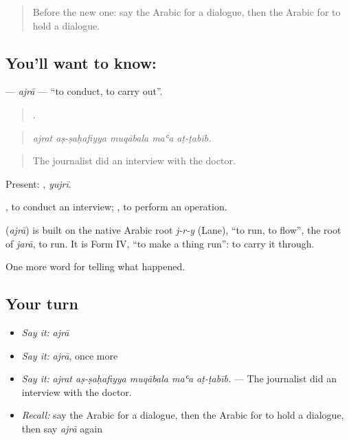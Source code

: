 \label{lesson:AR-C302-ajra}



\begin{quote}
Before the new one: say the Arabic for a dialogue, then the Arabic for to hold a dialogue.
\end{quote}

\subsection*{You'll want to know: }
\textbf{} — \emph{ajrā} — \textquotedblleft{}to conduct, to carry out\textquotedblright{}.

\begin{quote}
    .
\end{quote}

\begin{quote}
\emph{ajrat aṣ-ṣaḥafiyya muqābala maʿa aṭ-ṭabīb.}
\end{quote}

\begin{quote}
The journalist did an interview with the doctor.
\end{quote}

Present: , \emph{yujrī}.

 , to conduct an interview;  , to perform an operation.

\begin{cousinweb}
\textbf{} (\emph{ajrā}) is built on the native Arabic root \emph{j-r-y} (Lane), \textquotedblleft{}to run, to flow\textquotedblright{}, the root of \emph{jarā}, to run. It is Form IV, \textquotedblleft{}to make a thing run\textquotedblright{}: to carry it through.
\end{cousinweb}

\begin{grammarlens}[title={What you've built}]
One more word for telling what happened.
\end{grammarlens}

\subsection*{Your turn}
\begin{itemize}
\raggedright
  \item \emph{Say it:} \emph{ajrā}
  \item \emph{Say it:} \emph{ajrā}, once more
  \item \emph{Say it:} \emph{ajrat aṣ-ṣaḥafiyya muqābala maʿa aṭ-ṭabīb.} — The journalist did an interview with the doctor.
  \item \emph{Recall:} say the Arabic for a dialogue, then the Arabic for to hold a dialogue, then say \emph{ajrā} again
\end{itemize}

